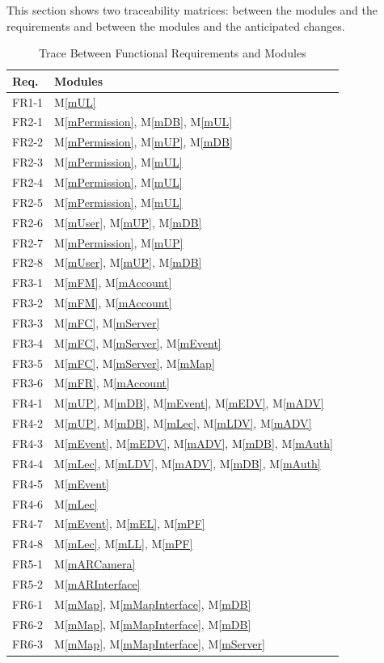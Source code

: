 \documentclass[12pt, titlepage]{article}
\newcommand{\mref}[1]{M\ref{#1}}
\begin{document}
This section shows two traceability matrices: between the modules and the
requirements and between the modules and the anticipated changes.

\begin{table}[H]
\centering
\begin{tabular}{p{} p{}}
\toprule
\textbf{Req.} & \textbf{Modules}\\
\midrule
FR1-1 & \mref{mUL}\\
FR2-1 & \mref{mPermission}, \mref{mDB}, \mref{mUL}\\
FR2-2 & \mref{mPermission}, \mref{mUP}, \mref{mDB}\\
FR2-3 & \mref{mPermission}, \mref{mUL}\\
FR2-4 & \mref{mPermission}, \mref{mUL}\\
FR2-5 & \mref{mPermission}, \mref{mUL}\\
FR2-6 & \mref{mUser}, \mref{mUP}, \mref{mDB}\\
FR2-7 & \mref{mPermission}, \mref{mUP}\\
FR2-8 & \mref{mUser}, \mref{mUP}, \mref{mDB}\\
FR3-1 & \mref{mFM}, \mref{mAccount}\\
FR3-2 & \mref{mFM}, \mref{mAccount}\\
FR3-3 & \mref{mFC}, \mref{mServer}\\
FR3-4 & \mref{mFC}, \mref{mServer}, \mref{mEvent}\\
FR3-5 & \mref{mFC}, \mref{mServer}, \mref{mMap}\\
FR3-6 & \mref{mFR}, \mref{mAccount}\\
FR4-1 & \mref{mUP}, \mref{mDB}, \mref{mEvent}, \mref{mEDV}, \mref{mADV}\\
FR4-2 & \mref{mUP}, \mref{mDB}, \mref{mLec}, \mref{mLDV}, \mref{mADV}\\
FR4-3 & \mref{mEvent}, \mref{mEDV}, \mref{mADV}, \mref{mDB}, \mref{mAuth}\\
FR4-4 & \mref{mLec}, \mref{mLDV}, \mref{mADV}, \mref{mDB}, \mref{mAuth}\\
FR4-5 & \mref{mEvent}\\
FR4-6 & \mref{mLec}\\
FR4-7 & \mref{mEvent}, \mref{mEL}, \mref{mPF}\\
FR4-8 & \mref{mLec}, \mref{mLL}, \mref{mPF}\\
FR5-1 & \mref{mARCamera}\\
FR5-2 & \mref{mARInterface}\\
FR6-1 & \mref{mMap}, \mref{mMapInterface}, \mref{mDB}\\
FR6-2 & \mref{mMap}, \mref{mMapInterface}, \mref{mDB}\\
FR6-3 & \mref{mMap}, \mref{mMapInterface}, \mref{mServer}\\
\bottomrule
\end{tabular}
\caption{Trace Between Functional Requirements and Modules}
\label{TblFRT}
\end{table}
\end{document}

